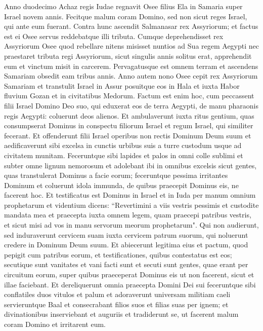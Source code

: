 \begin{biblechapter}  
\verse Anno duodecimo Achaz regis Iudae regnavit Osee filius Ela in Samaria super Israel novem annis. 
\verse Fecitque malum coram Domino, sed non sicut reges Israel, qui ante eum fuerant. 
\verse Contra hunc ascendit Salmanasar rex Assyriorum; et factus est ei Osee servus reddebatque illi tributa. 
\verse Cumque deprehendisset rex Assyriorum Osee quod rebellare nitens misisset nuntios ad Sua regem Aegypti nec praestaret tributa regi Assyriorum, sicut singulis annis solitus erat, apprehendit eum et vinctum misit in carcerem. 
\verse Pervagatusque est omnem terram et ascendens Samariam obsedit eam tribus annis. 
\verse Anno autem nono Osee cepit rex Assyriorum Samariam et transtulit Israel in Assur posuitque eos in Hala et iuxta Habor fluvium Gozan et in civitatibus Medorum. 
\verse Factum est enim hoc, cum peccassent filii Israel Domino Deo suo, qui eduxerat eos de terra Aegypti, de manu pharaonis regis Aegypti: coluerunt deos alienos.  
\verse Et ambulaverunt iuxta ritus gentium, quas consumpserat Dominus in conspectu filiorum Israel et regum Israel, qui similiter fecerant. 
\verse Et offenderunt filii Israel operibus non rectis Dominum Deum suum et aedificaverunt sibi excelsa in cunctis urbibus suis a turre custodum usque ad civitatem munitam.  
\verse Feceruntque sibi lapides et palos in omni colle sublimi et subter omne lignum nemorosum 
\verse et adolebant ibi in omnibus excelsis sicut gentes, quas transtulerat Dominus a facie eorum; feceruntque pessima irritantes Dominum  
\verse et coluerunt idola immunda, de quibus praecepit Dominus eis, ne facerent hoc. 
\verse Et testificatus est Dominus in Israel et in Iuda per manum omnium prophetarum et videntium dicens: “Revertimini a viis vestris pessimis et custodite mandata mea et praecepta iuxta omnem legem, quam praecepi patribus vestris, et sicut misi ad vos in manu servorum meorum prophetarum". 
\verse Qui non audierunt, sed induraverunt cervicem suam iuxta cervicem patrum suorum, qui noluerunt credere in Dominum Deum suum. 
\verse Et abiecerunt legitima eius et pactum, quod pepigit cum patribus eorum, et testificationes, quibus contestatus est eos; secutique sunt vanitates et vani facti sunt et secuti sunt gentes, quae erant per circuitum eorum, super quibus praeceperat Dominus eis ut non facerent, sicut et illae faciebant. 
\verse Et dereliquerunt omnia praecepta Domini Dei sui feceruntque sibi conflatiles duos vitulos et palum et adoraverunt universam militiam caeli servieruntque Baal 
\verse et consecrabant filios suos et filias suas per ignem; et divinationibus inserviebant et auguriis et tradiderunt se, ut facerent malum coram Domino et irritarent eum. 

\end{biblechapter}
